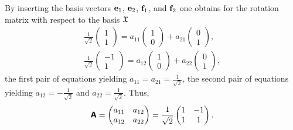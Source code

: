 {\begin{enumerate}
By
inserting the basis vectors
$ {\bf e}_1$, ${\bf e}_2$, ${\bf f}_1$, and ${\bf f}_2$
one obtains for the rotation matrix with respect to the basis ${\frak X}$
\begin{equation}
\begin{split}
\frac{1}{\sqrt{2}}
\begin{pmatrix}
1\\
1
\end{pmatrix}
=
a_{11}
\begin{pmatrix}
1 \\
0
\end{pmatrix}
+
a_{21}
\begin{pmatrix}
0 \\
1
\end{pmatrix} ,
\\
\frac{1}{\sqrt{2}}
\begin{pmatrix}
-1\\
1
\end{pmatrix}
=
a_{12}
\begin{pmatrix}
1 \\
0
\end{pmatrix}
+
a_{22}
\begin{pmatrix}
0 \\
1
\end{pmatrix}
,
\end{split}
\end{equation}
the first pair of equations yielding
$a_{11}=a_{21}=\frac{1}{\sqrt{2}}$,
the second pair of equations yielding
$a_{12}=-\frac{1}{\sqrt{2}}$ and $a_{22}=\frac{1}{\sqrt{2}}$.
Thus,
\begin{equation}
 \textsf{\textbf{A}}=
\begin{pmatrix}
a_{11}&a_{12}\\
a_{12}&a_{22}
\end{pmatrix}
=
\frac{1}{\sqrt{2}}
\begin{pmatrix}
1&-1\\
1&1
\end{pmatrix}
.
\end{equation}


\end{enumerate}}
